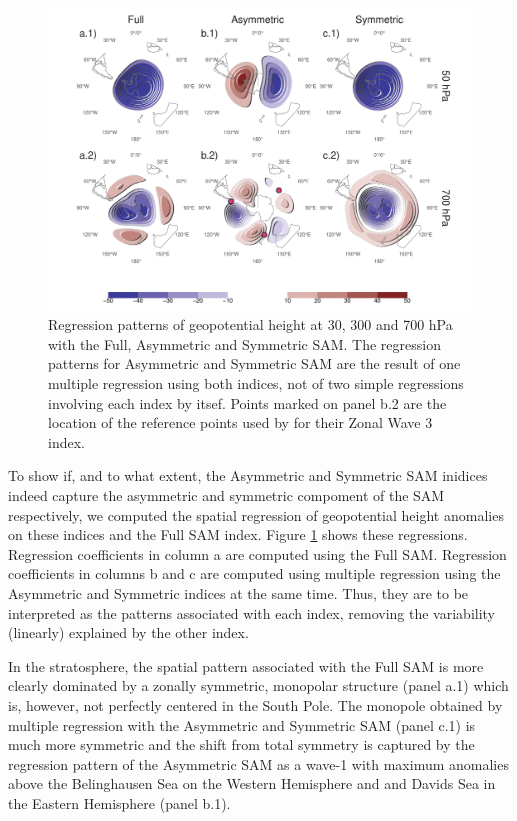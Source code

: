 \documentclass[twocol]{ametsocV5}
\begin{document}
\begin{figure}
\includegraphics{2d-regr-1} \caption[Regression patterns of geopotential height at 30, 300 and 700 hPa with the Full, Asymmetric and Symmetric SAM]{Regression patterns of geopotential height at 30, 300 and 700 hPa with the Full, Asymmetric and Symmetric SAM. The regression patterns for Asymmetric and Symmetric SAM are the result of one multiple regression using both indices, not of two simple regressions involving each index by itsef. Points marked on panel b.2 are the location of the reference points used by \cite{raphael2004} for their Zonal Wave 3 index.}\label{fig:2d-regr}
\end{figure}

To show if, and to what extent, the Asymmetric and Symmetric SAM
inidices indeed capture the asymmetric and symmetric compoment of the
SAM respectively, we computed the spatial regression of geopotential
height anomalies on these indices and the Full SAM index. Figure
\ref{fig:2d-regr} shows these regressions. Regression coefficients in
column a are computed using the Full SAM. Regression coefficients in
columns b and c are computed using multiple regression using the
Asymmetric and Symmetric indices at the same time. Thus, they are to be
interpreted as the patterns associated with each index, removing the
variability (linearly) explained by the other index.

In the stratosphere, the spatial pattern associated with the Full SAM is
more clearly dominated by a zonally symmetric, monopolar structure
(panel a.1) which is, however, not perfectly centered in the South Pole.
The monopole obtained by multiple regression with the Asymmetric and
Symmetric SAM (panel c.1) is much more symmetric and the shift from
total symmetry is captured by the regression pattern of the Asymmetric
SAM as a wave-1 with maximum anomalies above the Belinghausen Sea on the
Western Hemisphere and and Davids Sea in the Eastern Hemisphere (panel
b.1).
\end{document}
